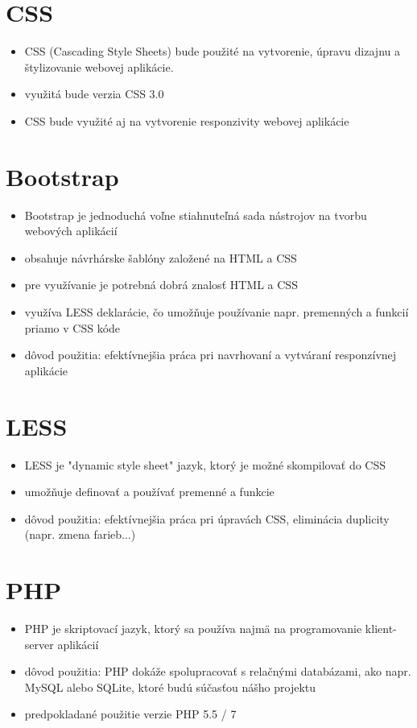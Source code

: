 \documentclass[12pt,a4paper]{report}
\theoremstyle{definition}
\theoremstyle{remark}
\begin{document}
\section{CSS}
\begin{itemize}
\item CSS (Cascading Style Sheets) bude použité na vytvorenie, úpravu dizajnu a štylizovanie webovej aplikácie.
\item využitá bude verzia CSS 3.0
\item CSS bude využité aj na vytvorenie responzivity webovej aplikácie
\end{itemize}

\section{Bootstrap}
\begin{itemize}
\item Bootstrap je jednoduchá voľne stiahnuteľná sada nástrojov na tvorbu webových aplikácií
\item obsahuje návrhárske šablóny založené na HTML a CSS
\item pre využívanie je potrebná dobrá znalosť HTML a CSS
\item využíva LESS deklarácie, čo umožňuje používanie napr. premenných a funkcií priamo v CSS kóde
\item dôvod použitia: efektívnejšia práca pri navrhovaní a vytváraní responzívnej aplikácie
\end{itemize}

\section{LESS}
\begin{itemize}
\item LESS je "dynamic style sheet"  jazyk, ktorý je možné skompilovať do CSS
\item umožňuje definovať a používať premenné a funkcie
\item dôvod použitia: efektívnejšia práca pri úpravách CSS, eliminácia duplicity (napr. zmena farieb...)
\end{itemize}

\section{PHP}
\begin{itemize}
\item PHP je skriptovací jazyk, ktorý sa používa najmä na programovanie klient-server aplikácií
\item dôvod použitia: PHP dokáže spolupracovať s relačnými databázami, ako napr. MySQL alebo SQLite, ktoré budú súčasťou nášho projektu
\item predpokladané použitie verzie PHP 5.5 / 7
\end{itemize}
\end{document}
